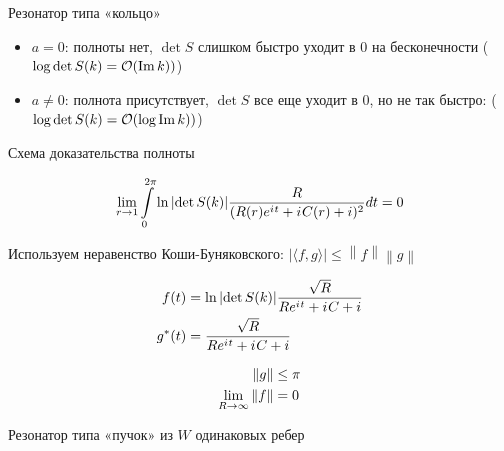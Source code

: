 \documentclass{beamer}
\begin{document}
\begin{frame}{Резонатор типа «кольцо»}
\begin{itemize}
\item $a = 0$: полноты нет, $\det S$ слишком быстро уходит в 0 на бесконечности ($\log \det S(k) = \mcO(\Im k))$)
\item $a \ne 0$: полнота присутствует, $\det S$ все еще уходит в 0, но не так быстро: ($\log \det S(k) = \mcO(\log \Im k))$)
\end{itemize}
\end{frame}





\begin{frame}{Схема доказательства полноты}

\[
\lim\limits_{r \to 1} \int\limits_{0}^{2 \pi} \ln \abs{\det S(k)} \frac{R}{(R(r) \eexp{\iu t} + \iu C(r) + i)^2} dt = 0
\]

Используем неравенство Коши-Буняковского: $\big| \langle f,g \rangle \big| \leq \left\|f\right\| \left\|g\right\|$

\begin{align*}
f(t)   &= \ln \abs{\det S(k)} \frac{\sqrt{R}}{R \eexp{\iu t} + \iu C + i} \\
g^*(t) &= \frac{\sqrt{R}}{R \eexp{\iu t} + \iu C + i}
\end{align*}

\begin{align*}
\norm{g} &\le \pi \\
\lim_{R \to \infty} \norm{f} &= 0
\end{align*}
\end{frame}



\begin{frame}{Резонатор типа «пучок» из $W$ одинаковых ребер}

\begin{figure}
\begin{tikzpicture}[scale=0.8]

\end{tikzpicture}
\end{figure}

\end{frame}
\end{document}

